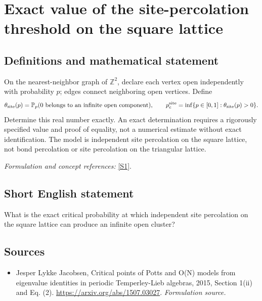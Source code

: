 \documentclass[11pt]{article}
\begin{document}
\section*{\texorpdfstring{Exact value of the site-percolation threshold on the square lattice}{Exact value of the site-percolation threshold on the square lattice}}\label{30006931}
\subsection{Definitions and mathematical statement}
On the nearest-neighbor graph of ${\mathbb{Z}}^2$, declare each vertex open independently with probability $p$; edges connect neighboring open vertices. Define
\[
 \theta_{\rm site}(p)={\mathbb{P}}_p(0\text{ belongs to an infinite open component}),
 \qquad
 p_c^{\rm site}=\inf\{p\in[0,1]:\theta_{\rm site}(p)>0\}.
\]
Determine this real number exactly. An exact determination requires a rigorously specified value and proof of equality, not a numerical estimate without exact identification. The model is independent site percolation on the square lattice, not bond percolation or site percolation on the triangular lattice.
\par\smallskip\textit{Formulation and concept references:} \href{https://arxiv.org/abs/1507.03027}{[S1]}.

\subsection{Short English statement}
What is the exact critical probability at which independent site percolation on the square lattice can produce an infinite open cluster?
\subsection{Sources}
\begin{itemize}
\item[S1]Jesper Lykke Jacobsen, Critical points of Potts and O(N) models from eigenvalue identities in periodic Temperley-Lieb algebras, 2015, Section 1(ii) and Eq. (2).
\url{https://arxiv.org/abs/1507.03027}.
\textit{Formulation source.}
\end{itemize}
\end{document}

